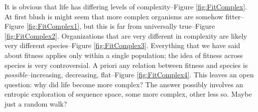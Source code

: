 \documentclass[]{article}
\begin{document}
It is obvious that life has differing levels of complexity--Figure \ref{fig:FitComplex}. At first blush is might seem that more complex organisms are somehow fitter--Figure \ref{fig:FitComplex1}, but this is far from universally true--Figure \ref{fig:FitComplex2}. Organizations that are very different in complexity are likely very different species--Figure \ref{fig:FitComplex3}. Everything that we have said about fitness applies only within a single population; the idea of fitness across species is very controversial. A priori any relation between fitness and species is \emph{possible}--increasing, decreasing, flat--Figure \ref{fig:FitComplex4}.
 This leaves an open question: why did life become more complex? The answer possibly involves an entropic exploration of sequence space, some more complex, other less so. Maybe just a random walk?
\end{document}
